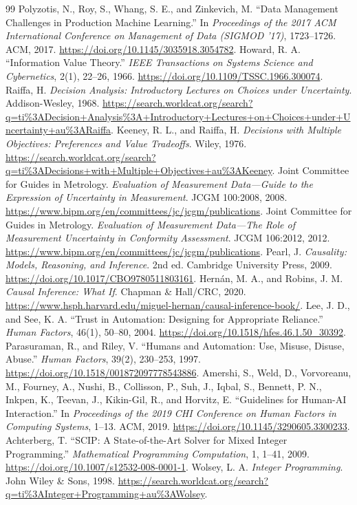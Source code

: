 \documentclass[a4paper,12pt,twoside]{report}
\theoremstyle{definition}
\begin{document}
\begin{thebibliography}{99}
 Polyzotis, N., Roy, S., Whang, S. E., and Zinkevich, M. ``Data Management Challenges in Production Machine Learning.'' In \emph{Proceedings of the 2017 ACM International Conference on Management of Data (SIGMOD '17)}, 1723--1726. ACM, 2017. \url{https://doi.org/10.1145/3035918.3054782}.
 Howard, R. A. ``Information Value Theory.'' \emph{IEEE Transactions on Systems Science and Cybernetics}, 2(1), 22--26, 1966. \url{https://doi.org/10.1109/TSSC.1966.300074}.
 Raiffa, H. \emph{Decision Analysis: Introductory Lectures on Choices under Uncertainty}. Addison-Wesley, 1968. \url{https://search.worldcat.org/search?q=ti%3ADecision+Analysis%3A+Introductory+Lectures+on+Choices+under+Uncertainty+au%3ARaiffa}.
 Keeney, R. L., and Raiffa, H. \emph{Decisions with Multiple Objectives: Preferences and Value Tradeoffs}. Wiley, 1976. \url{https://search.worldcat.org/search?q=ti%3ADecisions+with+Multiple+Objectives+au%3AKeeney}.
 Joint Committee for Guides in Metrology. \emph{Evaluation of Measurement Data---Guide to the Expression of Uncertainty in Measurement}. JCGM 100:2008, 2008. \url{https://www.bipm.org/en/committees/jc/jcgm/publications}.
 Joint Committee for Guides in Metrology. \emph{Evaluation of Measurement Data---The Role of Measurement Uncertainty in Conformity Assessment}. JCGM 106:2012, 2012. \url{https://www.bipm.org/en/committees/jc/jcgm/publications}.
 Pearl, J. \emph{Causality: Models, Reasoning, and Inference}. 2nd ed. Cambridge University Press, 2009. \url{https://doi.org/10.1017/CBO9780511803161}.
 Hern\'an, M. A., and Robins, J. M. \emph{Causal Inference: What If}. Chapman \& Hall/CRC, 2020. \url{https://www.hsph.harvard.edu/miguel-hernan/causal-inference-book/}.
 Lee, J. D., and See, K. A. ``Trust in Automation: Designing for Appropriate Reliance.'' \emph{Human Factors}, 46(1), 50--80, 2004. \url{https://doi.org/10.1518/hfes.46.1.50_30392}.
 Parasuraman, R., and Riley, V. ``Humans and Automation: Use, Misuse, Disuse, Abuse.'' \emph{Human Factors}, 39(2), 230--253, 1997. \url{https://doi.org/10.1518/001872097778543886}.
 Amershi, S., Weld, D., Vorvoreanu, M., Fourney, A., Nushi, B., Collisson, P., Suh, J., Iqbal, S., Bennett, P. N., Inkpen, K., Teevan, J., Kikin-Gil, R., and Horvitz, E. ``Guidelines for Human-AI Interaction.'' In \emph{Proceedings of the 2019 CHI Conference on Human Factors in Computing Systems}, 1--13. ACM, 2019. \url{https://doi.org/10.1145/3290605.3300233}.
 Achterberg, T. ``SCIP: A State-of-the-Art Solver for Mixed Integer Programming.'' \emph{Mathematical Programming Computation}, 1, 1--41, 2009. \url{https://doi.org/10.1007/s12532-008-0001-1}.
 Wolsey, L. A. \emph{Integer Programming}. John Wiley \& Sons, 1998. \url{https://search.worldcat.org/search?q=ti%3AInteger+Programming+au%3AWolsey}.
\end{thebibliography}
\end{document}
